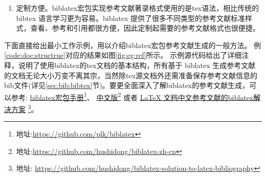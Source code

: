\begin{enumerate}
    \begin{example}{中文文献排序可利用biblatex选项}{eg:sort:opts}
    \begin{texlist}
    \usepackage[backend=biber,style=gb7714-2015ay,sortlocale=zh__pinyin]{biblatex}
    \usepackage[backend=biber,style=gb7714-2015ay,sortlocale=zh__stroke]{biblatex}%
    biber jobname
    \end{texlist}
    \end{example}

    \begin{example}{中文文献排序也可利用biber选项}{eg:sort:bibercmd}
    \begin{texlist}
    \usepackage[backend=biber,style=gb7714-2015ay]{biblatex}

    biber -l zh__pinyin jobname
    biber -l zh__stroke jobname
    \end{texlist}
    \end{example}

\item 定制方便。biblatex宏包实现参考文献著录格式使用的是tex语法，相比传统的bibtex 语言学习更为容易。biblatex 提供了很多不同类型的参考文献标准样式，查看、参考和引用都很方便，因此定制起需要的参考文献格式也很便捷。
\end{enumerate}


下面直接给出最小工作示例，用以介绍biblatex宏包参考文献生成的一般方法。
例\ref{code:doc:structrue}对应的结果如图\ref{fig:eg:ref}所示。
示例源代码给出了详细注释，说明了使用biblatex的tex文档的基本结构，所有基于 biblatex 生成参考文献的文档无论大小万变不离其宗，当然除tex源文档外还需准备保存参考文献信息的bib文件(详见\ref{sec:bib:bibtex}节)。要更全面深入了解biblatex的参考文献生成，可以参考:
\href{https://github.com/plk/biblatex}{biblatex宏包手册}\footnote{地址:\url{https://github.com/plk/biblatex}}、
\href{https://github.com/hushidong/biblatex-zh-cn}{中文版}\footnote{地址:\url{https://github.com/hushidong/biblatex-zh-cn}}
或者
\href{https://github.com/hushidong/biblatex-solution-to-latex-bibliography}{LaTeX 文档中文参考文献的biblatex解决方案}
\footnote{地址:
\url{https://github.com/hushidong/biblatex-solution-to-latex-bibliography}}。

